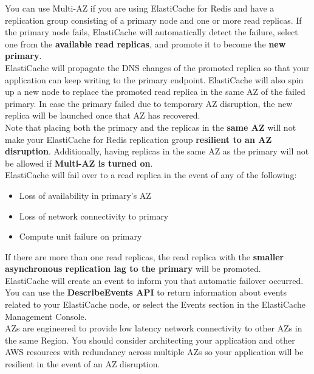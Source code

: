 \documentclass[12pt, letterpaper, twoside]{article}
\begin{document}
You can use Multi-AZ if you are using ElastiCache for Redis and have a replication group consisting of a primary node and one 
or more read replicas. If the primary node fails, ElastiCache will automatically detect the failure, select one from the 
\textbf{available read replicas}, and promote it to become the \textbf{new primary}.\\
ElastiCache will propagate the DNS changes of the promoted replica so that your application can keep writing to the primary 
endpoint. ElastiCache will also spin up a new node to replace the promoted read replica in the same AZ of the failed primary. 
In case the primary failed due to temporary AZ disruption, the new replica will be launched once that AZ has recovered.\\

Note that placing both the primary and the replicas in the \textbf{same AZ} will not make your ElastiCache for Redis 
replication group \textbf{resilient to an AZ disruption}. Additionally, having replicas in the same AZ as the primary will not 
be allowed if \textbf{Multi-AZ is turned on}.\\

ElastiCache will fail over to a read replica in the event of any of the following:
\begin{itemize}
	\item Loss of availability in primary’s AZ
	\item Loss of network connectivity to primary
	\item Compute unit failure on primary
\end{itemize}

If there are more than one read replicas, the read replica with the \textbf{smaller asynchronous replication lag to the primary}
will be promoted.\\

ElastiCache will create an event to inform you that automatic failover occurred. You can use the \textbf{DescribeEvents API} 
to return information about events related to your ElastiCache node, or select the Events section in the ElastiCache Management Console.\\

AZs are engineered to provide low latency network connectivity to other AZs in the same Region. You should consider architecting your 
application and other AWS resources with redundancy across multiple AZs so your application will be resilient in the event of an AZ 
disruption.\\
\end{document}
